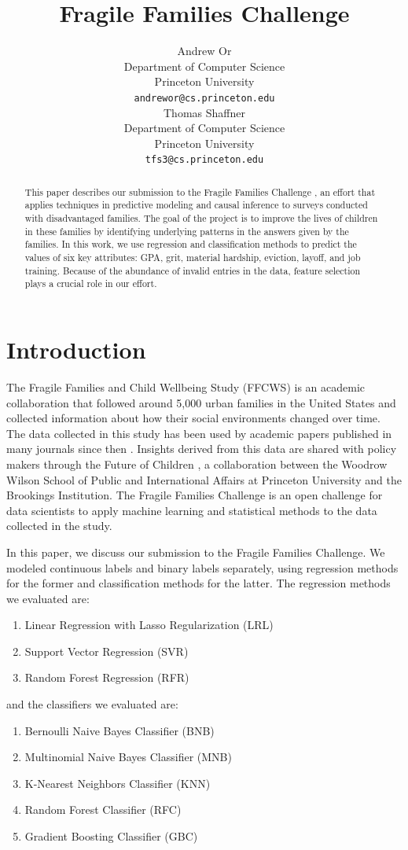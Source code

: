 \documentclass{article} %
\title{Fragile Families Challenge}
\author{
Andrew Or\\
Department of Computer Science\\
Princeton University\\
\texttt{andrewor@cs.princeton.edu} \\
\And
Thomas Shaffner \\
Department of Computer Science \\
Princeton University \\
\texttt{tfs3@cs.princeton.edu} \\
}
\begin{document}
\maketitle

\begin{abstract}

This paper describes our submission to the Fragile Families Challenge \cite{ffc}, an effort that applies techniques in predictive modeling and causal inference to surveys conducted with disadvantaged families. The goal of the project is to improve the lives of children in these families by identifying underlying patterns in the answers given by the families. In this work, we use regression and classification methods to predict the values of six key attributes: GPA, grit, material hardship, eviction, layoff, and job training. Because of the abundance of invalid entries in the data, feature selection plays a crucial role in our effort.

\end{abstract}
\section{Introduction}
\label{sec:intro}

The Fragile Families and Child Wellbeing Study (FFCWS) \cite{ffcws} is an academic collaboration that followed around 5,000 urban families in the United States and collected information about how their social environments changed over time. The data collected in this study has been used by academic papers published in many journals since then \cite{ffc_publications}. Insights derived from this data are shared with policy makers through the Future of Children \cite{foc}, a collaboration between the Woodrow Wilson School of Public and International Affairs at Princeton University and the Brookings Institution. The Fragile Families Challenge is an open challenge for data scientists to apply machine learning and statistical methods to the data collected in the study.

In this paper, we discuss our submission to the Fragile Families Challenge. We modeled continuous labels and binary labels separately, using regression methods for the former and classification methods for the latter. The regression methods we evaluated are:

\begin{enumerate}
\item Linear Regression with Lasso Regularization (LRL)
\item Support Vector Regression (SVR)
\item Random Forest Regression (RFR)
\end{enumerate}
and the classifiers we evaluated are:
\begin{enumerate}
\item Bernoulli Naive Bayes Classifier (BNB)
\item Multinomial Naive Bayes Classifier (MNB)
\item K-Nearest Neighbors Classifier (KNN)
\item Random Forest Classifier (RFC)
\item Gradient Boosting Classifier (GBC)
\end{enumerate}
\end{document}
